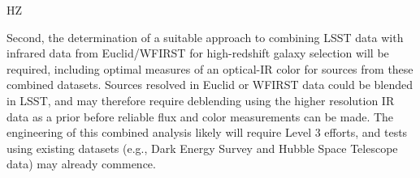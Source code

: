 {\begin{tasklist}{HZ}
\begin{task}
{Second, the determination of a suitable approach to combining LSST data with infrared data from Euclid/WFIRST for high-redshift galaxy selection will be required, including optimal measures of an optical-IR color for sources from these combined datasets. 
Sources resolved in Euclid or WFIRST data could be blended in LSST, and may therefore
require deblending using the higher resolution IR data as a prior before reliable flux and
color measurements can be made. The engineering of this combined analysis likely will require
Level 3 efforts, and tests using existing datasets (e.g., Dark Energy Survey and Hubble
Space Telescope data) may already commence.}
~\\
\end{task}


\end{tasklist}}
